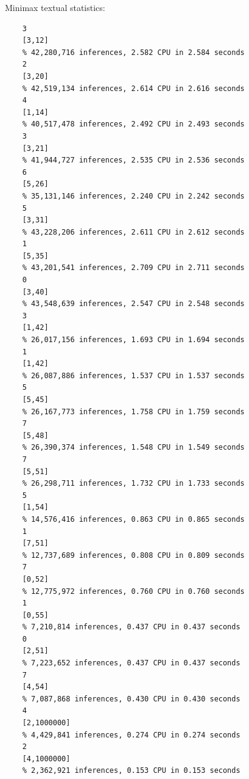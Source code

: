 \documentclass[11pt,a4paper]{article}
\begin{document}
Minimax textual statistics:
\begin{verbatim}
    3
    [3,12]
    % 42,280,716 inferences, 2.582 CPU in 2.584 seconds
    2
    [3,20]
    % 42,519,134 inferences, 2.614 CPU in 2.616 seconds
    4
    [1,14]
    % 40,517,478 inferences, 2.492 CPU in 2.493 seconds
    3
    [3,21]
    % 41,944,727 inferences, 2.535 CPU in 2.536 seconds
    6
    [5,26]
    % 35,131,146 inferences, 2.240 CPU in 2.242 seconds
    5
    [3,31]
    % 43,228,206 inferences, 2.611 CPU in 2.612 seconds
    1
    [5,35]
    % 43,201,541 inferences, 2.709 CPU in 2.711 seconds
    0
    [3,40]
    % 43,548,639 inferences, 2.547 CPU in 2.548 seconds
    3
    [1,42]
    % 26,017,156 inferences, 1.693 CPU in 1.694 seconds
    1
    [1,42]
    % 26,087,886 inferences, 1.537 CPU in 1.537 seconds
    5
    [5,45]
    % 26,167,773 inferences, 1.758 CPU in 1.759 seconds
    7
    [5,48]
    % 26,390,374 inferences, 1.548 CPU in 1.549 seconds
    7
    [5,51]
    % 26,298,711 inferences, 1.732 CPU in 1.733 seconds
    5
    [1,54]
    % 14,576,416 inferences, 0.863 CPU in 0.865 seconds
    1
    [7,51]
    % 12,737,689 inferences, 0.808 CPU in 0.809 seconds
    7
    [0,52]
    % 12,775,972 inferences, 0.760 CPU in 0.760 seconds
    1
    [0,55]
    % 7,210,814 inferences, 0.437 CPU in 0.437 seconds
    0
    [2,51]
    % 7,223,652 inferences, 0.437 CPU in 0.437 seconds
    7
    [4,54]
    % 7,087,868 inferences, 0.430 CPU in 0.430 seconds
    4
    [2,1000000]
    % 4,429,841 inferences, 0.274 CPU in 0.274 seconds
    2
    [4,1000000]
    % 2,362,921 inferences, 0.153 CPU in 0.153 seconds
\end{verbatim}
\end{document}
